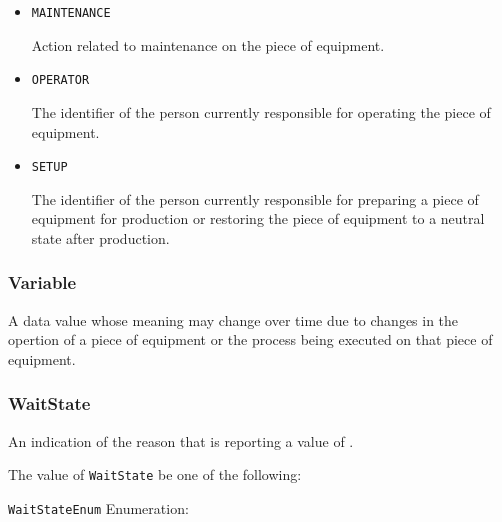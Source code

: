 \begin{itemize}

\item \texttt{MAINTENANCE}


Action related to maintenance on the piece of equipment.

\item \texttt{OPERATOR}


The identifier of the person currently responsible for operating the piece of equipment.

\item \texttt{SET\textunderscore UP}


The identifier of the person currently responsible for preparing a piece of equipment for production or restoring the piece of equipment to a neutral state after production.


\end{itemize}

\subsubsection{Variable}
\label{sec:Variable}



A data value whose meaning may change over time due to changes in the opertion of a piece of equipment or the process being executed on that piece of equipment.


\subsubsection{WaitState}
\label{sec:WaitState}



An indication of the reason that  is reporting a value of .


The value of \texttt{WaitState} \MUST be one of the following: 


\texttt{WaitStateEnum} Enumeration:

